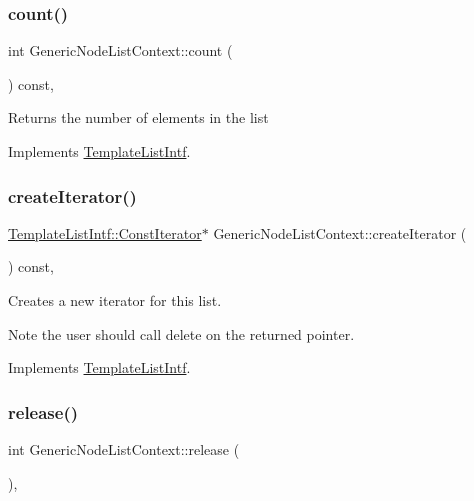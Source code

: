 \subsubsection{\texorpdfstring{count()}{count()}}
{\footnotesize\ttfamily int Generic\+Node\+List\+Context\+::count (\begin{DoxyParamCaption}{ }\end{DoxyParamCaption}) const\hspace{0.3cm}{\ttfamily [inline]}, {\ttfamily [virtual]}}

Returns the number of elements in the list 

Implements \mbox{\hyperlink{class_template_list_intf_a329e49e33484c2aa5106aac1bf4e5216}{Template\+List\+Intf}}.

\mbox{\label{class_generic_node_list_context_a7a6253477c70ef96f84c74a685bc8fdf}} 
\subsubsection{\texorpdfstring{createIterator()}{createIterator()}}
{\footnotesize\ttfamily \mbox{\hyperlink{class_template_list_intf_1_1_const_iterator}{Template\+List\+Intf\+::\+Const\+Iterator}}$\ast$ Generic\+Node\+List\+Context\+::create\+Iterator (\begin{DoxyParamCaption}{ }\end{DoxyParamCaption}) const\hspace{0.3cm}{\ttfamily [inline]}, {\ttfamily [virtual]}}

Creates a new iterator for this list. \begin{DoxyNote}{Note}
the user should call delete on the returned pointer. 
\end{DoxyNote}


Implements \mbox{\hyperlink{class_template_list_intf_a56b82384db24c3e121076a1da046d378}{Template\+List\+Intf}}.

\mbox{\label{class_generic_node_list_context_a0aa1daa5e593ca8326d05a9028759750}} 
\subsubsection{\texorpdfstring{release()}{release()}}
{\footnotesize\ttfamily int Generic\+Node\+List\+Context\+::release (\begin{DoxyParamCaption}{ }\end{DoxyParamCaption})\hspace{0.3cm}{\ttfamily [inline]}, {\ttfamily [virtual]}}


